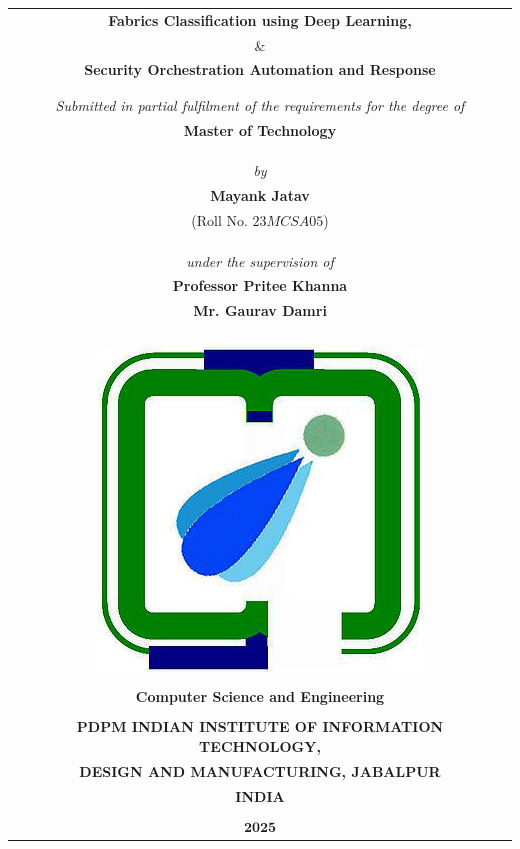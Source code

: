 
\begin{titlepage}
\thispagestyle{empty}


\begin{table}
	\centering
	\begin{tabular}{c}
		\Large \textbf{Fabrics Classification using Deep Learning,} \\
		\& \\
		\Large \textbf{Security Orchestration Automation and Response} \\
		\\
		\\
		\it Submitted in partial fulfilment of the requirements for the degree of	\\
		\bf Master of Technology	\\
		\\
		\\
		\\
		\it by	\\
		\large \bf {Mayank Jatav}	\\
		(Roll No. $23MCSA05$)	\\
		\\
		\\
		\\
		\it under the supervision of	\\
		\large \bf Professor Pritee Khanna	\\
		\large \bf Mr. Gaurav Damri \\

		\\
		\\
		\\
		\\
		\includegraphics[width=.17\textwidth]{images/iiitdmj.png}	\\
		\\
		\normalsize{\textbf{Computer Science and Engineering}}	\\
		\\
		\bf PDPM INDIAN INSTITUTE OF INFORMATION TECHNOLOGY,	\\
		\bf DESIGN AND MANUFACTURING, JABALPUR	\\
		\bf INDIA	\\
		\\
		$\mathbf{2025}$	\\
	\end{tabular}
\end{table}
\pagebreak


\thispagestyle{empty}
\end{titlepage}

